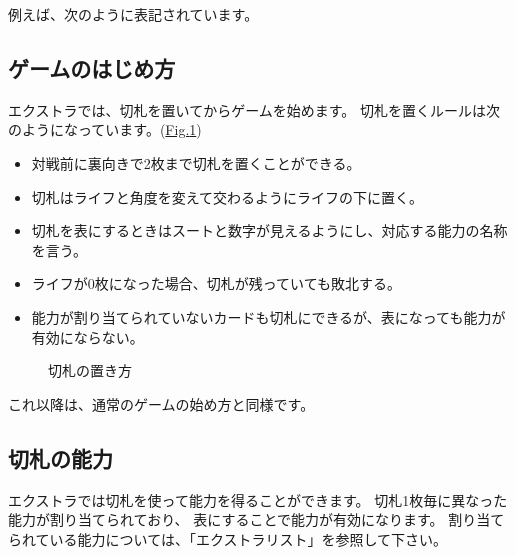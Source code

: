 \documentclass[letterpaper,10pt,dvipdfmx]{sphinxmanual}
\begin{document}
\sphinxAtStartPar
例えば、次のように表記されています。

\begin{sphinxVerbatim}[commandchars=\\\{\}]
\end{sphinxVerbatim}


\subsection{ゲームのはじめ方}
\label{\detokenize{common/common:extra-start}}\label{\detokenize{common/common:id38}}
\sphinxAtStartPar
エクストラでは、切札を置いてからゲームを始めます。
切札を置くルールは次のようになっています。(\hyperref[\detokenize{common/common:trump}]{Fig.\@ \ref{\detokenize{common/common:trump}}})
\begin{itemize}
\item {} 
\sphinxAtStartPar
対戦前に裏向きで2枚まで切札を置くことができる。

\item {} 
\sphinxAtStartPar
切札はライフと角度を変えて交わるようにライフの下に置く。

\item {} 
\sphinxAtStartPar
切札を表にするときはスートと数字が見えるようにし、対応する能力の名称を言う。

\item {} 
\sphinxAtStartPar
ライフが0枚になった場合、切札が残っていても敗北する。

\item {} 
\sphinxAtStartPar
能力が割り当てられていないカードも切札にできるが、表になっても能力が有効にならない。

\end{itemize}

\begin{figure}[htbp]
\centering
\capstart

\noindent{}
\caption{切札の置き方}\label{\detokenize{common/common:id58}}\label{\detokenize{common/common:trump}}\end{figure}

\sphinxAtStartPar
これ以降は、通常のゲームの始め方と同様です。


\subsection{切札の能力}
\label{\detokenize{common/common:id39}}
\sphinxAtStartPar
エクストラでは切札を使って能力を得ることができます。
切札1枚毎に異なった能力が割り当てられており、
表にすることで能力が有効になります。
割り当てられている能力については、「エクストラリスト」を参照して下さい。
\end{document}
